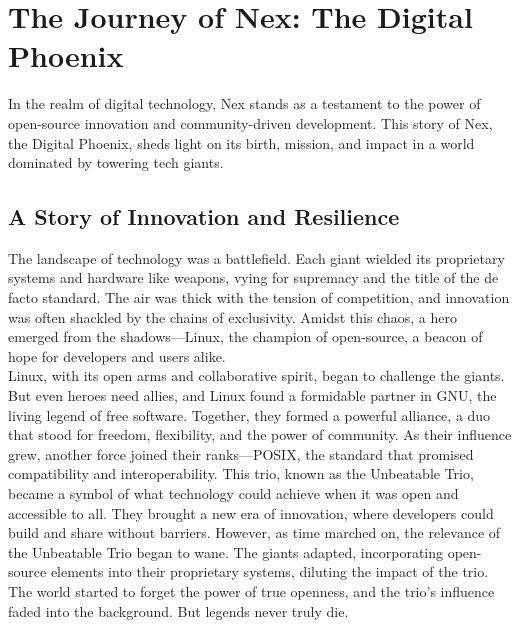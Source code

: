\section{The Journey of Nex: The Digital Phoenix}

In the realm of digital technology, Nex stands as a testament to the power of open-source innovation and community-driven development.
This story of Nex, the Digital Phoenix, sheds light on its birth, mission, and impact in a world dominated by towering tech giants.
\\
\subsection{A Story of Innovation and Resilience}

The landscape of technology was a battlefield.
Each giant wielded its proprietary systems and hardware like weapons, vying for supremacy and the title of the de facto standard.
The air was thick with the tension of competition, and innovation was often shackled by the chains of exclusivity.
Amidst this chaos, a hero emerged from the shadows—Linux, the champion of open-source, a beacon of hope for developers and users alike.
\\

Linux, with its open arms and collaborative spirit, began to challenge the giants.
But even heroes need allies, and Linux found a formidable partner in GNU, the living legend of free software.
Together, they formed a powerful alliance, a duo that stood for freedom, flexibility, and the power of community.
As their influence grew, another force joined their ranks—POSIX, the standard that promised compatibility and interoperability.
This trio, known as the Unbeatable Trio, became a symbol of what technology could achieve when it was open and accessible to all.
They brought a new era of innovation, where developers could build and share without barriers.
However, as time marched on, the relevance of the Unbeatable Trio began to wane. The giants adapted, incorporating open-source elements into their proprietary systems, diluting the impact of the trio.
The world started to forget the power of true openness, and the trio's influence faded into the background.
But legends never truly die.
\\

